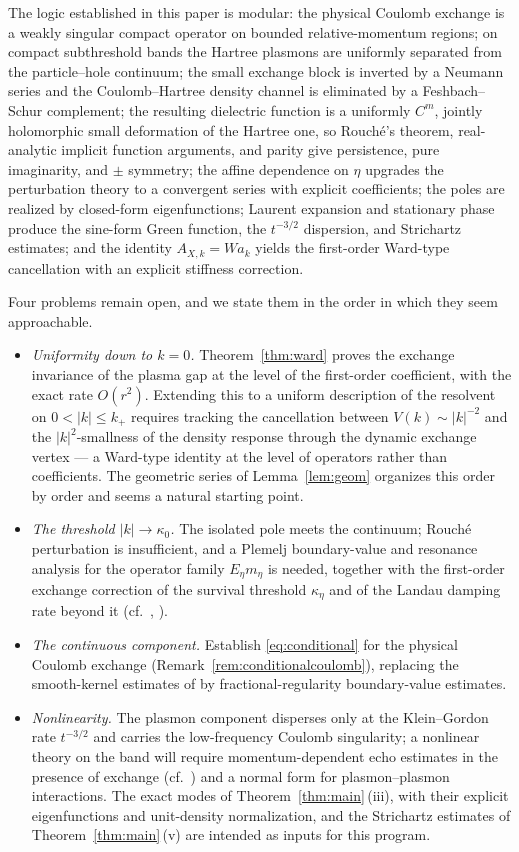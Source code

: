 \documentclass[11pt,a4paper]{amsart}
\theoremstyle{definition}
\theoremstyle{remark}
\begin{document}
The logic established in this paper is modular: the physical Coulomb exchange is a weakly singular compact operator on bounded relative-momentum regions; on compact subthreshold bands the Hartree plasmons are uniformly separated from the particle--hole continuum; the small exchange block is inverted by a Neumann series and the Coulomb--Hartree density channel is eliminated by a Feshbach--Schur complement; the resulting dielectric function is a uniformly $C^m$, jointly holomorphic small deformation of the Hartree one, so Rouch\'e's theorem, real-analytic implicit function arguments, and parity give persistence, pure imaginarity, and $\pm$ symmetry; the affine dependence on $\eta$ upgrades the perturbation theory to a convergent series with explicit coefficients; the poles are realized by closed-form eigenfunctions; Laurent expansion and stationary phase produce the sine-form Green function, the $t^{-3/2}$ dispersion, and Strichartz estimates; and the identity $A_{X,k}=Wa_k$ yields the first-order Ward-type cancellation with an explicit stiffness correction.

Four problems remain open, and we state them in the order in which they seem approachable.
\begin{itemize}
\item[1.] \emph{Uniformity down to $k=0$.} Theorem~\ref{thm:ward} proves the exchange invariance of the plasma gap at the level of the first-order coefficient, with the exact rate $O(r^2)$. Extending this to a uniform description of the resolvent on $0<|k|\le k_+$ requires tracking the cancellation between $V(k)\sim|k|^{-2}$ and the $|k|^2$-smallness of the density response through the dynamic exchange vertex --- a Ward-type identity at the level of operators rather than coefficients. The geometric series of Lemma~\ref{lem:geom} organizes this order by order and seems a natural starting point.
\item[2.] \emph{The threshold $|k|\to\kappa_0$.} The isolated pole meets the continuum; Rouch\'e perturbation is insufficient, and a Plemelj boundary-value and resonance analysis for the operator family $E_\eta m_\eta$ is needed, together with the first-order exchange correction of the survival threshold $\kappa_\eta$ and of the Landau damping rate beyond it (cf.\ \cite[Theorem~2.9]{NY1}, \cite{NguyenJFA}).
\item[3.] \emph{The continuous component.} Establish \eqref{eq:conditional} for the physical Coulomb exchange (Remark~\ref{rem:conditionalcoulomb}), replacing the smooth-kernel estimates of \cite{NY2} by fractional-regularity boundary-value estimates.
\item[4.] \emph{Nonlinearity.} The plasmon component disperses only at the Klein--Gordon rate $t^{-3/2}$ and carries the low-frequency Coulomb singularity; a nonlinear theory on the band will require momentum-dependent echo estimates in the presence of exchange (cf.\ \cite{NY2}) and a normal form for plasmon--plasmon interactions. The exact modes of Theorem~\ref{thm:main}\,(iii), with their explicit eigenfunctions and unit-density normalization, and the Strichartz estimates of Theorem~\ref{thm:main}\,(v) are intended as inputs for this program.
\end{itemize}
\end{document}

